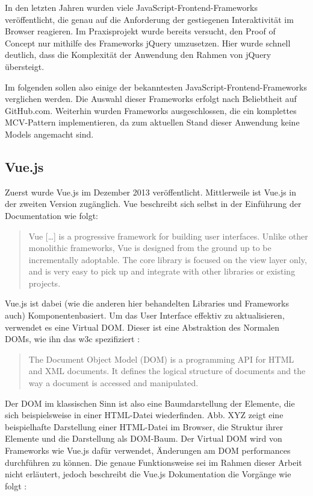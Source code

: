 In den letzten Jahren wurden viele JavaScript-Frontend-Frameworks veröffentlicht, die genau auf die Anforderung der gestiegenen Interaktivität im Browser reagieren.
Im Praxisprojekt wurde bereits versucht, den Proof of Concept nur mithilfe des Frameworks jQuery umzusetzen. Hier wurde schnell deutlich, dass die Komplexität der Anwendung den Rahmen von jQuery übersteigt.

Im folgenden sollen also einige der bekanntesten JavaScript-Frontend-Frameworks verglichen werden. Die Auswahl dieser Frameworks erfolgt nach Beliebtheit auf GitHub.com. Weiterhin wurden Frameworks ausgeschlossen, die ein komplettes MCV-Pattern implementieren, da zum aktuellen Stand dieser Anwendung keine Models angemacht sind.

\subsection{Vue.js}
Zuerst wurde Vue.js im Dezember 2013 veröffentlicht. Mittlerweile ist Vue.js in der zweiten Version zugänglich.
Vue beschreibt sich selbst in der Einführung der Documentation wie folgt:

\begin{quote}
  Vue […] is a progressive framework for building user interfaces. Unlike other monolithic frameworks, Vue is designed from the ground up to be incrementally adoptable. The core library is focused on the view layer only, and is very easy to pick up and integrate with other libraries or existing projects. \cite{VueIntro}
\end{quote}

Vue.js ist dabei (wie die anderen hier behandelten Libraries und Frameworks auch) Komponentenbasiert. Um das User Interface effektiv zu aktualisieren, verwendet es eine Virtual DOM. Dieser ist eine Abstraktion des Normalen DOMs, wie ihn das w3c spezifiziert \cite{w3cDOM}:

\begin{quote}
  The Document Object Model (DOM) is a programming API for HTML and XML documents. It defines the logical structure of documents and the way a document is accessed and manipulated.
\end{quote}

Der DOM im klassischen Sinn ist also eine Baumdarstellung der Elemente, die sich beispielsweise in einer HTML-Datei wiederfinden. Abb. XYZ zeigt eine beispielhafte Darstellung einer HTML-Datei im Browser, die Struktur ihrer Elemente und die Darstellung als DOM-Baum.
Der Virtual DOM wird von Frameworks wie Vue.js dafür verwendet, Änderungen am DOM performances durchführen zu können. Die genaue Funktionsweise sei im Rahmen dieser Arbeit nicht erläutert,  jedoch beschreibt die Vue.js Dokumentation die Vorgänge wie folgt \cite{VueTemplate}:

